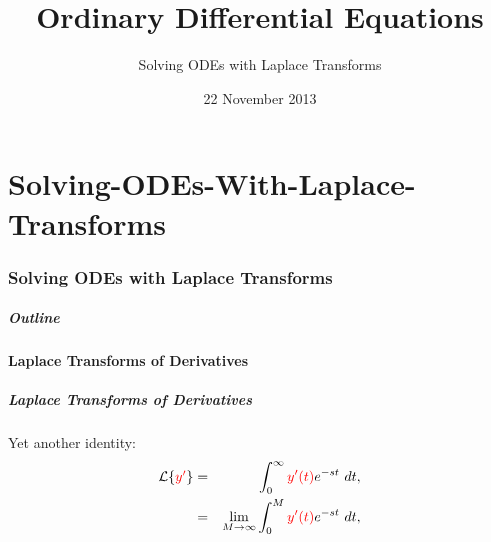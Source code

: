 \part{Solving-ODEs-With-Laplace-Transforms}
\section{Solving ODEs with Laplace Transforms}

\title{Ordinary Differential Equations}
\subtitle{Solving ODEs with Laplace Transforms}
\date{22 November 2013}

\begin{frame}
  \titlepage
\end{frame}

\begin{frame}
  \frametitle{Outline}
  \tableofcontents[ currentsection ]
\end{frame}


\subsection{Laplace Transforms of Derivatives}


\begin{frame}
  \frametitle{Laplace Transforms of Derivatives}

  Yet another identity:
  \begin{eqnarray*}
    \laplace{\redText{y'}} & = & \int^\infty_0 \redText{y'(t)} e^{-st} ~ dt, \\
    & = & \lim_{M\rightarrow\infty} \int^M_0 \redText{y'(t)} e^{-st} ~ dt, \\
    \end{eqnarray*}


\end{frame}


